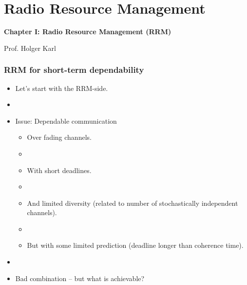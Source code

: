 \documentclass{beamer}
\begin{document}
\section{Radio Resource Management}
\begin{frame}
\centerline{\textbf{Chapter I: Radio Resource Management (RRM)}}
\begin{center}
 Prof. Holger Karl
\end{center}

\end{frame}
\begin{frame}
  \frametitle{RRM for short-term dependability}
  \begin{itemize}
  
  \item Let's start with the RRM-side.
  \item[]
  \item Issue:  Dependable communication 
    \begin{itemize}
    \item Over fading channels.
    \item[]
    \item With short deadlines.
    \item[]
    \item And limited  diversity (related to number of stochastically independent channels).
    \item[]
    \item But with some limited prediction (deadline longer than
      coherence time).
    \end{itemize}
 \item[]
 \item Bad combination -- but what is achievable? 
  \end{itemize}
\end{frame}
\end{document}
